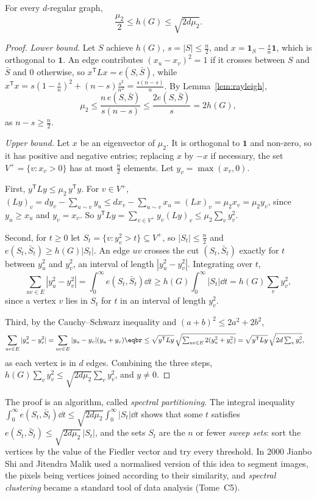 \begin{theorem}\label{thm:cheeger}
For every $d$-regular graph,
\[
\frac{\mu_2}2\le h(G)\le\sqrt{2d\mu_2}.
\]
\end{theorem}
\begin{proof}
\emph{Lower bound.} Let $S$ achieve $h(G)$, $s=|S|\le\frac n2$, and $x=\mathbf1_S-\frac sn\mathbf1$, which is orthogonal to $\mathbf1$. An edge contributes $(x_u-x_v)^2=1$ if it crosses between
$S$ and $\bar S$ and $0$ otherwise, so $x^{\mathsf T}Lx=e(S,\bar S)$, while $x^{\mathsf T}x=s(1-\frac sn)^2+(n-s)\frac{s^2}{n^2}=\frac{s(n-s)}n$. By Lemma~\ref{lem:rayleigh},
\[
\mu_2\le\frac{n\,e(S,\bar S)}{s(n-s)}\le\frac{2e(S,\bar S)}s=2h(G),
\]
as $n-s\ge\frac n2$.

\emph{Upper bound.} Let $x$ be an eigenvector of $\mu_2$. It is orthogonal to $\mathbf1$ and non-zero, so it has positive and negative entries; replacing $x$ by $-x$ if necessary, the set
$V^+=\{v:x_v>0\}$ has at most $\frac n2$ elements. Let $y_v=\max(x_v,0)$.

First, $y^{\mathsf T}Ly\le\mu_2\,y^{\mathsf T}y$. For $v\in V^+$, $(Ly)_v=dy_v-\sum_{u\sim v}y_u\le dx_v-\sum_{u\sim v}x_u=(Lx)_v=\mu_2x_v=\mu_2y_v$, since $y_u\ge x_u$ and $y_v=x_v$. So
$y^{\mathsf T}Ly=\sum_{v\in V^+}y_v(Ly)_v\le\mu_2\sum_vy_v^2$.

Second, for $t\ge0$ let $S_t=\{v:y_v^2>t\}\subseteq V^+$, so $|S_t|\le\frac n2$ and $e(S_t,\bar S_t)\ge h(G)|S_t|$. An edge $uv$ crosses the cut $(S_t,\bar S_t)$ exactly for $t$ between $y_u^2$ and $y_v^2$,
an interval of length $|y_u^2-y_v^2|$. Integrating over $t$,
\[
\sum_{uv\in E}|y_u^2-y_v^2|=\int_0^\infty e(S_t,\bar S_t)\dd t\ge h(G)\int_0^\infty|S_t|\dd t=h(G)\sum_vy_v^2,
\]
since a vertex $v$ lies in $S_t$ for $t$ in an interval of length $y_v^2$.

Third, by the Cauchy--Schwarz inequality and $(a+b)^2\le2a^2+2b^2$,
\[
\begin{aligned}\sum_{uv\in E}|y_u^2-y_v^2|&=\sum_{uv\in E}|y_u-y_v|(y_u+y_v)\eqbr\le\sqrt{y^{\mathsf T}Ly}\,\sqrt{\textstyle\sum_{uv\in E}2(y_u^2+y_v^2)}=\sqrt{y^{\mathsf T}Ly}\,\sqrt{2d\textstyle\sum_vy_v^2},\end{aligned}
\]
as each vertex is in $d$ edges. Combining the three steps, $h(G)\sum_vy_v^2\le\sqrt{2d\mu_2}\sum_vy_v^2$, and $y\neq0$.
\end{proof}

The proof is an algorithm, called \emph{spectral partitioning}. The integral inequality $\int_0^\infty e(S_t,\bar S_t)\dd t\le\sqrt{2d\mu_2}\int_0^\infty|S_t|\dd t$ shows that some $t$ satisfies
$e(S_t,\bar S_t)\le\sqrt{2d\mu_2}\,|S_t|$, and the sets $S_t$ are the $n$ or fewer \emph{sweep sets}: sort the vertices by the value of the Fiedler vector and try every threshold. In 2000 Jianbo Shi and
Jitendra Malik used a normalised version of this idea to segment images, the pixels being vertices joined according to their similarity, and \emph{spectral clustering} became a standard tool of
data analysis (Tome~C5).

